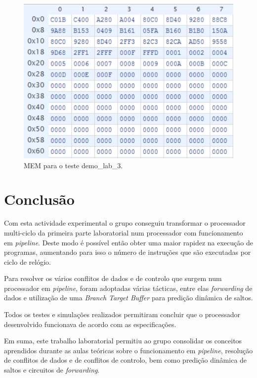 \documentclass[a4paper]{article}
\begin{document}
		\begin{figure}[h]
			\centering
			\includegraphics[width=1.\textwidth]{img/imem_3}
			\caption{MEM para o teste demo_lab_3.}
			\label{fig:imem_3}
		\end{figure}
		
	\section{Conclusão}
	
	Com esta actividade experimental o grupo conseguiu transformar o processador multi-ciclo da primeira parte laboratorial num processador com funcionamento em \textit{pipeline}. Deste modo é possível então obter uma maior rapidez na execução de programas, aumentando para isso o número de instruções que são executadas por ciclo de relógio.
	
	Para resolver os vários conflitos de dados e de controlo que surgem num processador em \textit{pipeline}, foram adoptadas várias tácticas, entre elas \textit{forwarding} de dados e utilização de uma \textit{Branch Target Buffer} para predição dinâmica de saltos.
	
	 Todos os testes e simulações realizados permitiram concluir que o processador desenvolvido funcionava de acordo com as especificações.
	 
	  Em suma, este trabalho laboratorial permitiu ao grupo consolidar os conceitos aprendidos durante as aulas teóricas sobre o funcionamento em \textit{pipeline}, resolução de conflitos de dados e de conflitos de controlo, bem como predição dinâmica de saltos e circuitos de \textit{forwarding}.
\end{document}

